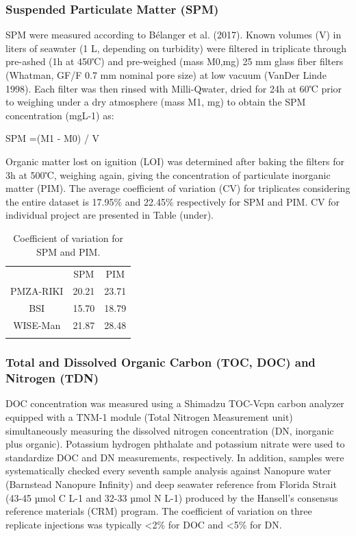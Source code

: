 \documentclass[essd, manuscript]{copernicus}
\begin{document}
\subsubsection{Suspended Particulate Matter (SPM)}
SPM were measured according to Bélanger et al. (2017). Known volumes (V) in liters of seawater (1 L, depending on turbidity) were filtered in triplicate through pre-ashed (1h at 450℃) and pre-weighed (mass M0,mg) 25 mm glass fiber filters (Whatman, GF/F 0.7 mm nominal pore size) at low vacuum (VanDer Linde 1998). Each filter was then rinsed with Milli-Qwater, dried for 24h at 60℃ prior to weighing under a dry atmosphere (mass M1, mg) to obtain the SPM concentration (mgL-1) as:

SPM =(M1 - M0) / V

Organic matter lost on ignition (LOI) was determined after baking the filters for 3h at 500℃, weighing again, giving the concentration of particulate inorganic matter (PIM).
The average coefficient of variation (CV) for triplicates considering the entire dataset is 17.95\% and 22.45\% respectively for SPM and PIM. CV for individual project are presented in Table (under).

\begin{table}[t]
\caption{Coefficient of variation for SPM and PIM.}
\centering
\begin{tabular}{ c|cc  }
\tophline
 & SPM & PIM\\
\middlehline
PMZA-RIKI & 20.21 & 23.71 \\
BSI & 15.70 & 18.79 \\
WISE-Man & 21.87 & 28.48 \\
\bottomhline
 \end{tabular}
 \label{table:SPMCV}
\end{table}

\subsubsection{Total and Dissolved Organic Carbon (TOC, DOC) and Nitrogen (TDN)}
DOC concentration was measured using a Shimadzu TOC-Vcpn carbon analyzer equipped with a TNM-1 module (Total Nitrogen Measurement unit) simultaneously measuring the dissolved nitrogen concentration (DN, inorganic plus organic). Potassium hydrogen phthalate and potassium nitrate were used to standardize DOC and DN measurements, respectively. In addition, samples were systematically checked every seventh sample analysis against Nanopure water (Barnstead Nanopure Infinity) and deep seawater reference from Florida Strait (43-45 µmol C L-1 and 32-33 µmol N L-1) produced by the Hansell’s consensus reference materials (CRM) program. The coefficient of variation on three replicate injections was typically <2\% for DOC and <5\% for DN.
\end{document}
